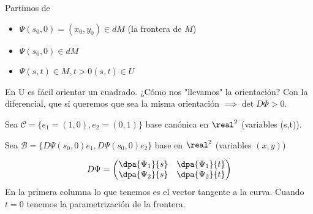 Partimos de \begin{itemize}
\item $\Psi(s_0,0) = (x_0,y_0)\in dM$ (la frontera de $M$)
\item $\Psi(s_0,0) \in dM$
\item $\Psi(s,t) \in M, t>0 (s,t)\in U$
\end{itemize}

En U es fácil orientar un cuadrado. ¿Cómo nos "llevamos" la orientación? Con la diferencial, que si queremos que sea la misma orientación $\implies \det D\Phi > 0$.

Sea $\mathcal{C} = \{e_1=(1,0),e_2=(0,1)\}$ base canónica en $\real^2$ (variables (s,t)).

Sea $\mathcal{B} = \{D\Psi(s_0,0)e_1,D\Psi(s_0,0)e_2\}$ base en $\real^2$ (variables $(x,y)$)

\[D\Psi = \begin{pmatrix}
\dpa{\Psi_1}{s} &\dpa{\Psi_1}{t}\\
\dpa{\Psi_2}{s} &\dpa{\Psi_2}{t}
\end{pmatrix}\]
En la primera columna lo que tenemos es el vector tangente a la curva. Cuando $t=0$ tenemos la parametrización de la frontera.